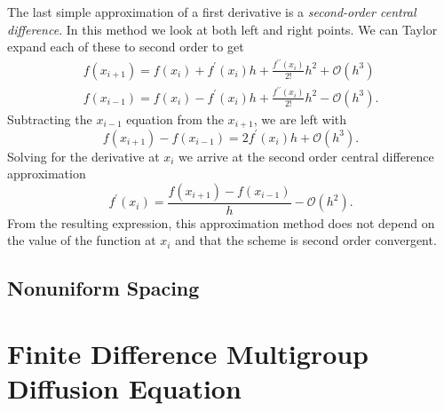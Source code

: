 The last simple approximation of a first derivative is a \emph{second-order central difference}. In this method we look 
at both left and right points. We can Taylor expand each of these to second order to get
\begin{eqnarray}
    f\left(x_{i+1}\right) = f\left(x_{i}\right) + f^{\prime}\left(x_{i}\right)h + \frac{f^{\prime\prime}\left(x_{i}\right)}{2!}h^{2} + \mathcal{O}\left(h^{3}\right) \\
    f\left(x_{i-1}\right) = f\left(x_{i}\right) - f^{\prime}\left(x_{i}\right)h + \frac{f^{\prime\prime}\left(x_{i}\right)}{2!}h^{2} - \mathcal{O}\left(h^{3}\right).
\end{eqnarray}
Subtracting the $x_{i-1}$ equation from the $x_{i+1}$, we are left with
\begin{equation}
    f\left(x_{i+1}\right) - f\left(x_{i-1}\right) = 2f^{\prime}\left(x_{i}\right)h  + \mathcal{O}\left(h^{3}\right).
\end{equation}
Solving for the derivative at $x_{i}$ we arrive at the second order central difference approximation
\begin{equation}
    f^{\prime}\left(x_{i}\right) = \frac{f\left(x_{i+1}\right) - f\left(x_{i-1}\right)}{h} - \mathcal{O}\left(h^{2}\right).
\end{equation}
From the resulting expression, this approximation method does not depend on the value of the function at $x_{i}$ and that
the scheme is second order convergent.


\subsection{Nonuniform Spacing}
\label{subsec:fdm_nonuniform}


\section{Finite Difference Multigroup Diffusion Equation}

